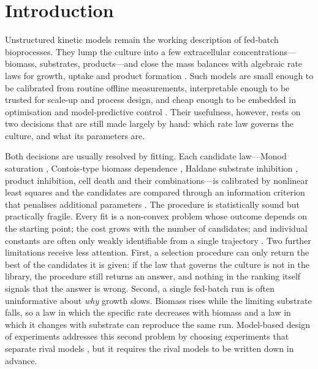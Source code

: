 \section{Introduction}\label{sec:intro}

Unstructured kinetic models remain the working description of fed-batch bioprocesses. They lump the culture into a few extracellular concentrations---biomass, substrates, products---and close the mass balances with algebraic rate laws for growth, uptake and product formation \citep{Villadsen2011}. Such models are small enough to be calibrated from routine offline measurements, interpretable enough to be trusted for scale-up and process design, and cheap enough to be embedded in optimisation and model-predictive control \citep{Almquist2014,Narayanan2020}. Their usefulness, however, rests on two decisions that are still made largely by hand: which rate law governs the culture, and what its parameters are.

Both decisions are usually resolved by fitting. Each candidate law---Monod saturation \citep{Monod1949}, Contois-type biomass dependence \citep{Contois1959}, Haldane substrate inhibition \citep{Andrews1968}, product inhibition, cell death and their combinations---is calibrated by nonlinear least squares and the candidates are compared through an information criterion that penalises additional parameters \citep{Akaike1974,Schwarz1978,Burnham2002}. The procedure is statistically sound but practically fragile. Every fit is a non-convex problem whose outcome depends on the starting point; the cost grows with the number of candidates; and individual constants are often only weakly identifiable from a single trajectory \citep{Raue2009,Saa2017}. Two further limitations receive less attention. First, a selection procedure can only return the best of the candidates it is given: if the law that governs the culture is not in the library, the procedure still returns an answer, and nothing in the ranking itself signals that the answer is wrong. Second, a single fed-batch run is often uninformative about \emph{why} growth slows. Biomass rises while the limiting substrate falls, so a law in which the specific rate decreases with biomass and a law in which it changes with substrate can reproduce the same run. Model-based design of experiments addresses this second problem by choosing experiments that separate rival models \citep{HunterReiner1965,BoxHill1967,BuzziFerraris1983,Franceschini2008}, but it requires the rival models to be written down in advance.

